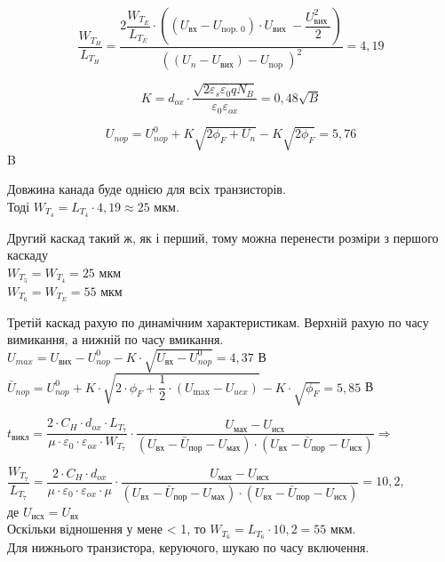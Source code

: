 \documentclass[a4paper,14pt]{extreport}
\begin{document}
$$
\dfrac{W_{T_{H}}}{L_{T_{H}}}=
\dfrac{2 \dfrac{W_{T_{E}}}{L_{T_E}} \cdot\left(\left(U_{\text{вх}}-U_{\text {nop. 0}}\right) \cdot U_{\text {вих }}-
\dfrac{U_{\text {вих }}^{2}}{2}\right)}{\left(\left(U_{n}-U_{\text{вих}}\right)-U_{\text {nop }}\right)^{2}}=4,19
$$

$$  K = d_{ox}\cdot \dfrac{\sqrt{2\varepsilon_s \varepsilon_0 q N_B }}{\varepsilon_0 \varepsilon_{ox}} = 0,48 \sqrt{B}  $$

$$ U_{nop} =  U_{nop}^0+K\sqrt{2\phi_F+U_n}-K\sqrt{2\phi_F}  = 5,76 $$ B 

Довжина канада буде однією для всіх  транзисторів. \\
Тоді $W_{T_{4}} =  L_{T_{4}} \cdot 4,19 \approx 25 \text{ мкм}$.

Другий каскад такий ж, як і перший, тому можна перенести розміри з першого каскаду  \\
$W_{T_{5}}=W_{T_{4}}=25  \text{ мкм}$\\
$W_{T_{6}}=W_{T_{E}}=55  \text{ мкм}$

Третій каскад рахую по динамічним характеристикам. Верхній рахую по часу  вимикання, а нижній по часу вмикання.\\
$U_{m a x}=U_{\text{вих}}-U_{n o p}^{0}-K \cdot \sqrt{U_{\text{вх}}-U_{n o p}^{0}}=4,37 $ В\\
$\bar{U}_{n o p}=U_{n o p}^{0}+K \cdot \sqrt{2 \cdot \phi_{F}+\dfrac{1}{2} \cdot\left(U_{\max }-U_{u c x}\right)}-K \cdot \sqrt{\phi_{F}}=5,85$ В


$t_{\text{викл}} = \dfrac{2\cdot C_H \cdot d_{ox} \cdot L_{T_{7}}}{\mu \cdot \varepsilon_0 \cdot \varepsilon_{ox} \cdot W_{T_{7}}} \cdot
\dfrac{U_{\text{мах}} - U_{\text{исх}}}{(U_{\text{вх}} - \bar{U}_{\text{пор}} - U_{\text{мах}})\cdot(U_{\text{вх}} - \bar{U}_{\text{пор}} - U_{\text{исх}})} \Rightarrow$

$ \dfrac{W_{T_{7}}}{L_{T_{7}}} =
\dfrac{2\cdot C_H \cdot d_{ox} }{\mu \cdot \varepsilon_0 \cdot \varepsilon_{ox} \cdot\mu} \cdot
\dfrac{U_{\text{мах}} - U_{\text{исх}}}{(U_{\text{вх}} - \bar{U}_{\text{пор}} - U_{\text{мах}})\cdot(U_{\text{вх}} - \bar{U}_{\text{пор}} - U_{\text{исх}})} = 10,2$,  \\

де  $U_{\text{исх}} = U_{\text{вх}}$\\

Оскільки відношення у мене < 1,  то $W_{T_{6}} = L_{T_{6}} \cdot 10,2 =  55$ мкм.\\

Для нижнього транзистора, керуючого, шукаю по часу включення.\\
\end{document}

